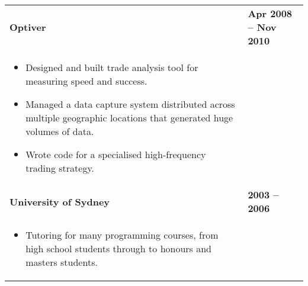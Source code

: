 \documentclass[]{article}
\begin{document}
\begin{table*}[h!]
\begin{tabular}[h!]{p{12.7cm}l}
\textbf{Optiver} & \textbf{Apr 2008 -- Nov 2010}\\
\begin{itemize}[noitemsep,topsep=0pt]
\item {Designed and built trade analysis tool for measuring speed and success.}
\item {Managed a data capture system distributed across multiple geographic locations that generated huge volumes of data.}
\item {Wrote code for a specialised high-frequency trading strategy.}
\end{itemize}
& \\

\textbf{University of Sydney} & \textbf{2003 -- 2006}\\
\begin{itemize}[noitemsep,topsep=0pt]
\item {Tutoring for many programming courses, from high school students through to honours and masters students.}
\end{itemize}
& \\



\end{tabular}
\end{table*}
\end{document}
